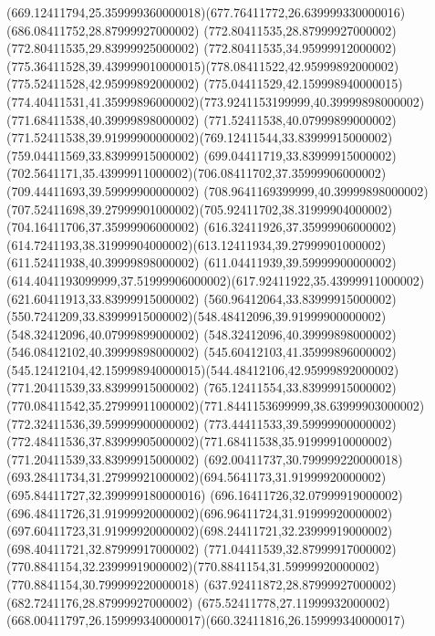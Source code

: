 {{	\curveto(669.12411794,25.359999360000018)(677.76411772,26.639999330000016)(686.08411752,28.87999927000002)
	\lineto(772.80411535,28.87999927000002)
	\lineto(772.80411535,29.83999925000002)
	\curveto(772.80411535,34.95999912000002)(775.36411528,39.439999010000015)(778.08411522,42.95999892000002)
	\lineto(775.52411528,42.95999892000002)
	\curveto(775.04411529,42.159998940000015)(774.40411531,41.35999896000002)(773.9241153199999,40.39999898000002)
	\lineto(771.68411538,40.39999898000002)
	\lineto(771.52411538,40.07999899000002)
	\curveto(771.52411538,39.91999900000002)(769.12411544,33.83999915000002)(759.04411569,33.83999915000002)
	\lineto(699.04411719,33.83999915000002)
	\curveto(702.5641171,35.43999911000002)(706.08411702,37.35999906000002)(709.44411693,39.59999900000002)
	\lineto(708.9641169399999,40.39999898000002)
	\curveto(707.52411698,39.27999901000002)(705.92411702,38.31999904000002)(704.16411706,37.35999906000002)
	\lineto(616.32411926,37.35999906000002)
	\curveto(614.7241193,38.31999904000002)(613.12411934,39.27999901000002)(611.52411938,40.39999898000002)
	\lineto(611.04411939,39.59999900000002)
	\curveto(614.4041193099999,37.51999906000002)(617.92411922,35.43999911000002)(621.60411913,33.83999915000002)
	\lineto(560.96412064,33.83999915000002)
	\curveto(550.7241209,33.83999915000002)(548.48412096,39.91999900000002)(548.32412096,40.07999899000002)
	\lineto(548.32412096,40.39999898000002)
	\lineto(546.08412102,40.39999898000002)
	\curveto(545.60412103,41.35999896000002)(545.12412104,42.159998940000015)(544.48412106,42.95999892000002)
	\closepath
	\moveto(771.20411539,33.83999915000002)
	\lineto(765.12411554,33.83999915000002)
	\curveto(770.08411542,35.27999911000002)(771.8441153699999,38.63999903000002)(772.32411536,39.59999900000002)
	\lineto(773.44411533,39.59999900000002)
	\curveto(772.48411536,37.83999905000002)(771.68411538,35.91999910000002)(771.20411539,33.83999915000002)
	\closepath
	\moveto(692.00411737,30.799999220000018)
	\curveto(693.28411734,31.27999921000002)(694.5641173,31.91999920000002)(695.84411727,32.399999180000016)
	\curveto(696.16411726,32.07999919000002)(696.48411726,31.91999920000002)(696.96411724,31.91999920000002)
	\curveto(697.60411723,31.91999920000002)(698.24411721,32.23999919000002)(698.40411721,32.87999917000002)
	\lineto(771.04411539,32.87999917000002)
	\curveto(770.8841154,32.23999919000002)(770.8841154,31.59999920000002)(770.8841154,30.799999220000018)
	\closepath
	\moveto(637.92411872,28.87999927000002)
	\lineto(682.7241176,28.87999927000002)
	\curveto(675.52411778,27.11999932000002)(668.00411797,26.159999340000017)(660.32411816,26.159999340000017)
}}
